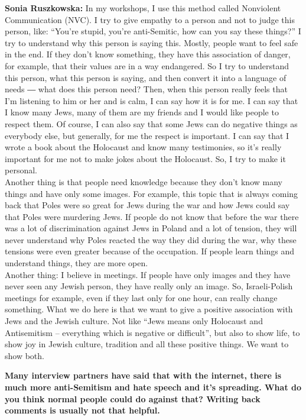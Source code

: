 \textbf{Sonia Ruszkowska:} In my workshops, I use this method called Nonviolent Communication (NVC). I try to give empathy to a person and not to judge this person, like: ``You’re stupid, you’re anti-Semitic, how can you say these things?'' I try to understand why this person is saying this. Mostly, people want to feel safe in the end. If they don’t know something, they have this association of danger, for example, that their values are in a way endangered. So I try to understand this person, what this person is saying, and then convert it into a language of needs ― what does this person need? Then, when this person really feels that I’m listening to him or her and is calm, I can say how it is for me. I can say that I know many Jews, many of them are my friends and I would like people to respect them. Of course, I can also say that some Jews can do negative things as everybody else, but generally, for me the respect is important. I can say that I wrote a book about the Holocaust and know many testimonies, so it’s really important for me not to make jokes about the Holocaust. So, I try to make it personal.\\ 
Another thing is that people need knowledge because they don’t know many things and have only some images. For example, this topic that is always coming back that Poles were so great for Jews during the war and how Jews could say that Poles were murdering Jews. If people do not know that before the war there was a lot of discrimination against Jews in Poland and a lot of tension, they will never understand why Poles reacted the way they did during the war, why these tensions were even greater because of the occupation. If people learn things and understand things, they are more open.\\  
Another thing: I believe in meetings. If people have only images and they have never seen any Jewish person, they have really only an image. So, Israeli-Polish meetings for example, even if they last only for one hour, can really change something. What we do here is that we want to give a positive association with Jews and the Jewish culture. Not like ``Jews means only Holocaust and Antisemitism – everything which is negative or difficult'', but also to show life, to show joy in Jewish culture, tradition and all these positive things. We want to show both. 

\textbf{Many interview partners have said that with the internet, there is much more anti-Semitism and hate speech and it’s spreading. What do you think normal people could do against that? Writing back comments is usually not that helpful.} 

